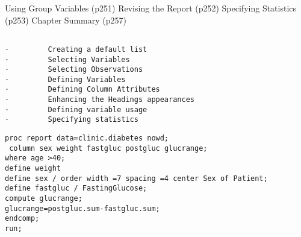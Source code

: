 Using Group Variables (p251)
Revising the Report (p252)
Specifying Statistics (p253)
Chapter Summary (p257)
\begin{verbatim}

·         Creating a default list
·         Selecting Variables
·         Selecting Observations
·         Defining Variables
·         Defining Column Attributes
·         Enhancing the Headings appearances
·         Defining variable usage
·         Specifying statistics
\end{verbatim}

\begin{framed}
\begin{verbatim}
proc report data=clinic.diabetes nowd;
 column sex weight fastgluc postgluc glucrange;
where age >40;
define weight
define sex / order width =7 spacing =4 center Sex of Patient;
define fastgluc / FastingGlucose;
compute glucrange;
glucrange=postgluc.sum-fastgluc.sum;
endcomp;
run;
\end{verbatim}
\end{framed}




